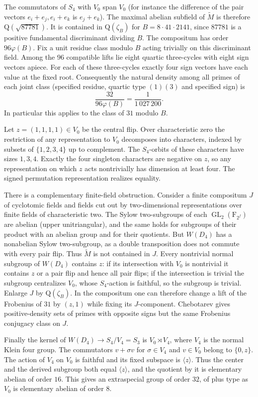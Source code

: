 \documentclass[11pt]{article}
\newcommand{\Q}{\mathrm Q}
\newcommand{\F}{\mathrm F}
\begin{document}
The commutators of $S_4$ with $V_0$ span $V_0$ (for instance
the difference of the pair vectors $e_i+e_j,e_i+e_k$ is $e_j+e_k$).
The maximal abelian subfield of $\widetilde M$ is therefore
$\Q(\sqrt{87781})$. It is contained in $\Q(\zeta_B)$ for
$B=8\cdot41\cdot2141$, since $87781$ is a positive fundamental
discriminant dividing $B$. The compositum has order $96\varphi(B)$.
Fix a unit residue class modulo $B$ acting trivially on this
discriminant field. Among the $96$ compatible lifts lie eight
quartic three-cycles with eight sign vectors apiece. For each of
these three-cycles exactly four sign vectors have each value at the
fixed root. Consequently the natural density among all primes of
each joint class (specified residue, quartic type $(1)(3)$ and
specified sign) is
\[
 \frac{32}{96\varphi(B)}=\frac1{1\,027\,200}.
\]
In particular this applies to the class of $31$ modulo $B$.

Let $z=(1,1,1,1)\in V_0$ be the central flip. Over characteristic
zero the restriction of any representation to $V_0$ decomposes
into characters, indexed by subsets of $\{1,2,3,4\}$ up to complement.
The $S_4$-orbits of these characters have sizes $1,3,4$.
Exactly the four singleton characters are negative on $z$, so any
representation on which $z$ acts nontrivially has dimension at
least four. The signed permutation representation realizes equality.

There is a complementary finite-field obstruction. Consider a
finite compositum $J$ of cyclotomic fields and fields cut out by
two-dimensional representations over finite fields of characteristic
two. The Sylow two-subgroups of each $\operatorname{GL}_2(\F_{2^f})$
are abelian (upper unitriangular), and the same holds for subgroups
of their product with an abelian group and for their quotients.
But $W(D_4)$ has a nonabelian Sylow two-subgroup, as a double
transposition does not commute with every pair flip. Thus
$\widetilde M$ is not contained in $J$. Every nontrivial normal
subgroup of $W(D_4)$ contains $z$: if its intersection with $V_0$
is nontrivial it contains $z$ or a pair flip and hence all pair
flips; if the intersection is trivial the subgroup centralizes
$V_0$, whose $S_4$-action is faithful, so the subgroup is trivial.
Enlarge $J$ by $\Q(\zeta_B)$. In the compositum one can therefore
change a lift of the Frobenius of $31$ by $(z,1)$ while fixing its
$J$-component. Chebotarev gives positive-density sets of primes
with opposite signs but the same Frobenius conjugacy class on $J$.

Finally the kernel of $W(D_4)\to S_4/V_4=S_3$ is
$V_0\rtimes V_4$, where $V_4$ is the normal Klein four group.
The commutators $v+\sigma v$ for $\sigma\in V_4$ and $v\in V_0$
belong to $\{0,z\}$. The action of $V_4$ on $V_0$ is faithful and
its fixed subspace is $\langle z\rangle$. Thus the center and the
derived subgroup both equal $\langle z\rangle$, and the quotient
by it is elementary abelian of order $16$. This gives an extraspecial
group of order $32$, of plus type as $V_0$ is elementary abelian of
order $8$.
\end{document}

